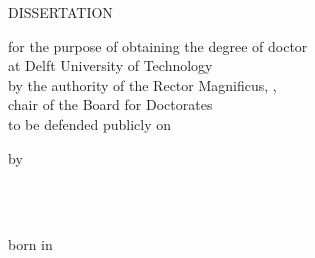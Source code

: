 \makeatletter
\newcommand{\thesis@titleblock}[1]{\begingroup \parskip\z@ \parindent\z@
    \chapterheadstart\thesis@chapterlabelspace \centering #1\endgroup}

\thispagestyle{empty}
\thesis@titleblock{\fontsize{0.75\dimexpr\chaptertitlesize\relax}{1.15\dimexpr\chaptertitlesize\relax}\headingfont
    \thesistitle\par}

\cleardoublepage

\thispagestyle{empty}
\thesis@titleblock{%
    {\fontsize{\chaptertitlesize}{1.15\dimexpr\chaptertitlesize\relax}\headingfont\thesistitle\par}
    \bigskip
    {\sffamily\Large\thesissubtitle\par}}
\vfill
\begin{center}
    {\runningheadcaps DISSERTATION}

    \bigskip

    for the purpose of obtaining the degree of doctor \\
    at Delft University of Technology \\
    by the authority of the Rector Magnificus, \rectormagnificus, \\
    chair of the Board for Doctorates \\
    to be defended publicly on \\
    \thesisdefencedate

    \bigskip
    \bigskip

    by

    \bigskip
    \bigskip

    {\headingfont\Large\bfseries \thesisauthorfirstnames\ \MakeUppercase{\thesisauthorlastname}}

    \bigskip
    \bigskip

    \thesisdegree \\
    born in \thesisbirthplace

    \vspace*{2\bigskipamount}
\end{center}

